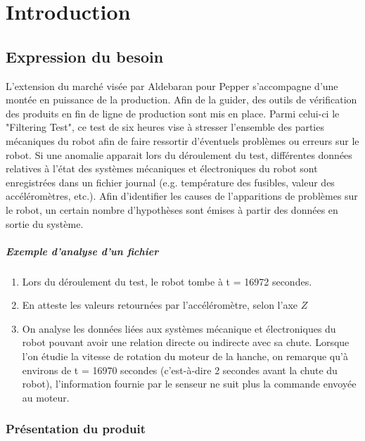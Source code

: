 \chapter{Introduction}
\label{Introduction}
\thispagestyle{fancy}

\section{Expression du besoin}
\label{Introduction:Expression du besoin}
L'extension du marché visée par Aldebaran pour Pepper s'accompagne d'une montée en puissance de la production. Afin de la guider, des outils de vérification des produits en fin de ligne de production sont mis en place. Parmi celui-ci le "Filtering Test", ce test de six heures vise à stresser l'ensemble des parties mécaniques du robot afin de faire ressortir d'éventuels problèmes ou erreurs sur le robot. Si une anomalie apparait lors du déroulement du test, différentes données relatives à l'état des systèmes mécaniques et électroniques du robot sont enregistrées dans un fichier journal (e.g. température des fusibles, valeur des accéléromètres, etc.). Afin d'identifier les causes de l'apparitions de problèmes sur le robot, un certain nombre d'hypothèses sont émises à partir des données en sortie du système. 

\paragraph{Exemple d'analyse d'un fichier}
\label{Introduction:Expression du besoin:Exemple d'analyse d'un fichier}
\begin{enumerate}
	\item Lors du déroulement du test, le robot tombe à t = 16972 secondes.
	\item En atteste les valeurs retournées par l'accéléromètre, selon l'axe $Z$
	\item On analyse les données liées aux systèmes mécanique et électroniques du robot pouvant avoir une relation directe ou indirecte avec sa chute.  
	Lorsque l'on étudie la vitesse de rotation du moteur de la hanche, on remarque qu'à environs de  t = 16970 secondes (c'est-à-dire 2 secondes avant la chute du robot),  l'information fournie par le senseur ne suit plus la commande  envoyée au moteur.
\end{enumerate}

\subsection{Présentation du produit}
\label{Introduction:Expression du besoin:Présentation du produit}

